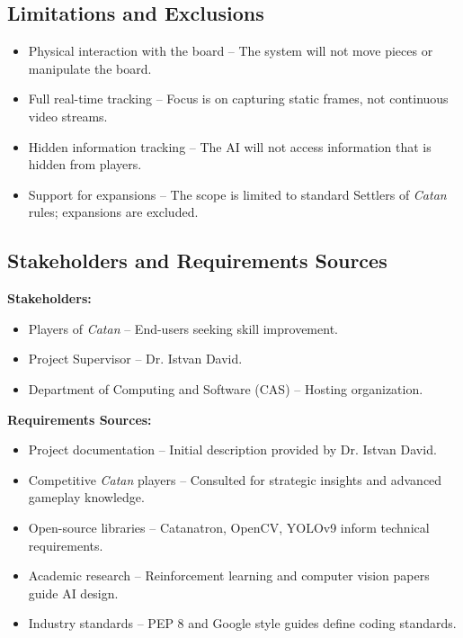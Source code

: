 \documentclass{article}
\begin{document}
\subsection{Limitations and Exclusions}\label{subsec:limitations-and-exclusions}
\begin{itemize}
    \item {Physical interaction with the board} – The system will not move pieces or manipulate the board.
    \item {Full real-time tracking} – Focus is on capturing static frames, not continuous video streams.
    \item {Hidden information tracking} – The AI will not access information that is hidden from players.
    \item {Support for expansions} – The scope is limited to standard Settlers of \emph{Catan} rules; expansions are excluded.
\end{itemize}

\subsection{Stakeholders and Requirements Sources}\label{subsec:stakeholders-and-requirements-sources}
\textbf{Stakeholders:}
\begin{itemize}
    \item Players of \emph{Catan} – End-users seeking skill improvement.
    \item Project Supervisor – Dr. Istvan David.
    \item Department of Computing and Software (CAS) – Hosting organization.
\end{itemize}

\textbf{Requirements Sources:}
\begin{itemize}
    \item Project documentation – Initial description provided by Dr. Istvan David.
    \item Competitive \emph{Catan} players – Consulted for strategic insights and advanced gameplay knowledge.
    \item Open-source libraries – Catanatron, OpenCV, YOLOv9 inform technical requirements.
    \item Academic research – Reinforcement learning and computer vision papers guide AI design.
    \item Industry standards – PEP 8 and Google style guides define coding standards.
\end{itemize}
\end{document}

